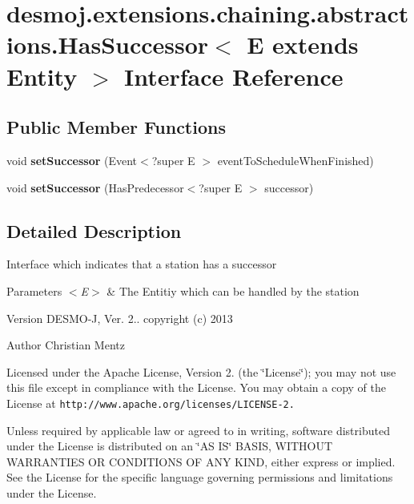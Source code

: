 \section{desmoj.\-extensions.\-chaining.\-abstractions.\-Has\-Successor$<$ E extends Entity $>$ Interface Reference}
\label{interfacedesmoj_1_1extensions_1_1chaining_1_1abstractions_1_1_has_successor_3_01_e_01extends_01_entity_01_4}
\subsection*{Public Member Functions}
\begin{DoxyCompactItemize}
\item 
void {\bf set\-Successor} (Event$<$?super E $>$ event\-To\-Schedule\-When\-Finished)
\item 
void {\bf set\-Successor} (Has\-Predecessor$<$?super E $>$ successor)
\end{DoxyCompactItemize}


\subsection{Detailed Description}
Interface which indicates that a station has a successor


\begin{DoxyParams}{Parameters}
{\em $<$\-E$>$} & The Entitiy which can be handled by the station\\
\hline
\end{DoxyParams}
\begin{DoxyVersion}{Version}
D\-E\-S\-M\-O-\/\-J, Ver. 2.. copyright (c) 2013 
\end{DoxyVersion}
\begin{DoxyAuthor}{Author}
Christian Mentz
\end{DoxyAuthor}
Licensed under the Apache License, Version 2. (the \char`\"{}\-License\char`\"{}); you may not use this file except in compliance with the License. You may obtain a copy of the License at {\tt http\-://www.\-apache.\-org/licenses/\-L\-I\-C\-E\-N\-S\-E-\/2.}

Unless required by applicable law or agreed to in writing, software distributed under the License is distributed on an \char`\"{}\-A\-S I\-S\char`\"{} B\-A\-S\-I\-S, W\-I\-T\-H\-O\-U\-T W\-A\-R\-R\-A\-N\-T\-I\-E\-S O\-R C\-O\-N\-D\-I\-T\-I\-O\-N\-S O\-F A\-N\-Y K\-I\-N\-D, either express or implied. See the License for the specific language governing permissions and limitations under the License. 

